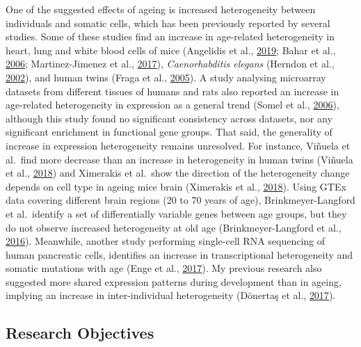 \documentclass[12pt,twoside]{unicam}
\begin{document}
One of the suggested effects of ageing is increased heterogeneity between individuals and somatic cells, which has been previously reported by several studies. Some of these studies find an increase in age-related heterogeneity in heart, lung and white blood cells of mice (Angelidis et al., \protect\hyperlink{ref-Angelidis2019}{2019}; Bahar et al., \protect\hyperlink{ref-Bahar2006}{2006}; Martinez-Jimenez et al., \protect\hyperlink{ref-Martinez-Jimenez2017}{2017}), \emph{Caenorhabditis elegans} (Herndon et al., \protect\hyperlink{ref-Herndon2002}{2002}), and human twins (Fraga et al., \protect\hyperlink{ref-Fraga2005}{2005}). A study analysing microarray datasets from different tissues of humans and rats also reported an increase in age-related heterogeneity in expression as a general trend (Somel et al., \protect\hyperlink{ref-Somel2006}{2006}), although this study found no significant consistency across datasets, nor any significant enrichment in functional gene groups. That said, the generality of increase in expression heterogeneity remains unresolved. For instance, Viñuela et al.~find more decrease than an increase in heterogeneity in human twins (Viñuela et al., \protect\hyperlink{ref-Vinuela2018}{2018}) and Ximerakis et al.~show the direction of the heterogeneity change depends on cell type in ageing mice brain (Ximerakis et al., \protect\hyperlink{ref-Ximerakis2018}{2018}). Using GTEx data covering different brain regions (20 to 70 years of age), Brinkmeyer-Langford et al.~identify a set of differentially variable genes between age groups, but they do not observe increased heterogeneity at old age (Brinkmeyer-Langford et al., \protect\hyperlink{ref-Brinkmeyer-Langford2016}{2016}). Meanwhile, another study performing single-cell RNA sequencing of human pancreatic cells, identifies an increase in transcriptional heterogeneity and somatic mutations with age (Enge et al., \protect\hyperlink{ref-Enge2017}{2017}). My previous research also suggested more shared expression patterns during development than in ageing, implying an increase in inter-individual heterogeneity (Dönertaş et al., \protect\hyperlink{ref-Donertas2017}{2017}).

\hypertarget{research-objectives}{%
\subsection{Research Objectives}\label{research-objectives}}
\end{document}
